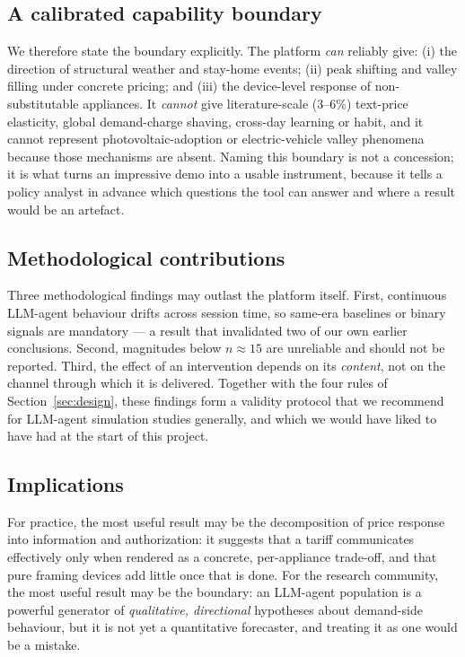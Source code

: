 \documentclass[11pt]{article}
\begin{document}
\subsection{A calibrated capability boundary}
We therefore state the boundary explicitly. The platform \emph{can} reliably give: (i) the direction of
structural weather and stay-home events; (ii) peak shifting and valley filling under concrete pricing;
and (iii) the device-level response of non-substitutable appliances. It \emph{cannot} give
literature-scale (3--6\%) text-price elasticity, global demand-charge shaving, cross-day learning or
habit, and it cannot represent photovoltaic-adoption or electric-vehicle valley phenomena because those
mechanisms are absent. Naming this boundary is not a concession; it is what turns an impressive demo into
a usable instrument, because it tells a policy analyst in advance which questions the tool can answer and
where a result would be an artefact.

\subsection{Methodological contributions}
Three methodological findings may outlast the platform itself. First, continuous LLM-agent behaviour
drifts across session time, so same-era baselines or binary signals are mandatory --- a result that
invalidated two of our own earlier conclusions. Second, magnitudes below $n\approx15$ are unreliable and
should not be reported. Third, the effect of an intervention depends on its \emph{content}, not on the
channel through which it is delivered. Together with the four rules of Section~\ref{sec:design}, these
findings form a validity protocol that we recommend for LLM-agent simulation studies generally, and which
we would have liked to have had at the start of this project.

\subsection{Implications}
For practice, the most useful result may be the decomposition of price response into
information and authorization: it suggests that a tariff communicates effectively only when rendered as a
concrete, per-appliance trade-off, and that pure framing devices add little once that is done. For the
research community, the most useful result may be the boundary: an LLM-agent population is a powerful
generator of \emph{qualitative, directional} hypotheses about demand-side behaviour, but it is not yet a
quantitative forecaster, and treating it as one would be a mistake.
\end{document}
